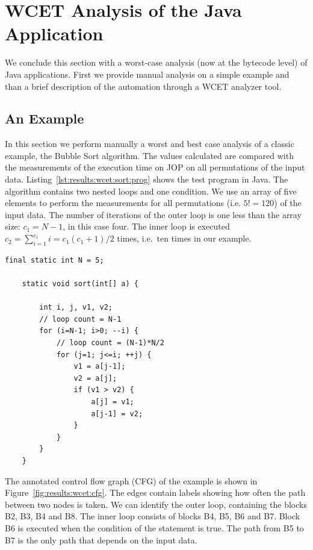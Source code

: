 \section{WCET Analysis of the Java Application}


We conclude this section with a worst-case analysis (now at the
bytecode level) of Java applications. First we provide manual
analysis on a simple example and than a brief description of the
automation through a WCET analyzer tool.

\subsection{An Example} \label{subsec:wcet:eval}


In this section we perform manually a worst and best case analysis
of a classic example, the Bubble Sort algorithm. The values
calculated are compared with the measurements of the execution time
on JOP on all permutations of the input data.
Listing~\ref{lst:results:wcet:sort:prog} shows the test program in
Java. The algorithm contains two nested loops and one condition. We
use an array of five elements to perform the measurements for all
permutations (i.e. $5!=120$) of the input data. The number of
iterations of the outer loop is one less than the array size:
$c_1=N-1$, in this case four. The inner loop is executed $c_2 =
\sum_{i=1}^{c_1}i = c_1(c_1+1)/2$ times, i.e.\ ten times in our
example.


\begin{lstlisting}[float,caption={Bubble Sort test program for the WCET analysis},
label=lst:results:wcet:sort:prog]
    final static int N = 5;

    static void sort(int[] a) {

        int i, j, v1, v2;
        // loop count = N-1
        for (i=N-1; i>0; --i) {
            // loop count = (N-1)*N/2
            for (j=1; j<=i; ++j) {
                v1 = a[j-1];
                v2 = a[j];
                if (v1 > v2) {
                    a[j] = v1;
                    a[j-1] = v2;
                }
            }
        }
    }
\end{lstlisting}

The annotated control flow graph (CFG) of the example is shown in
Figure~\ref{fig:results:wcet:cfg}. The edges contain labels showing
how often the path between two nodes is taken. We can identify the
outer loop, containing the blocks B2, B3, B4 and B8. The inner loop
consists of blocks B4, B5, B6 and B7. Block B6 is executed when the
condition of the  statement is true. The path from B5 to B7
is the only path that depends on the input data.

